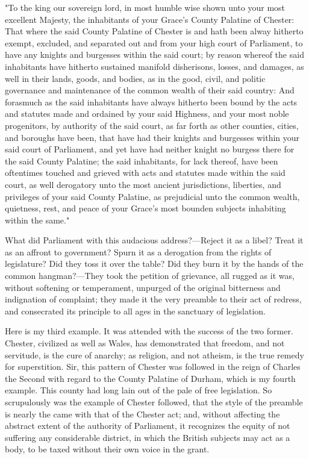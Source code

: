 "To the king our sovereign lord, in most humble wise shown unto your most excellent Majesty, the inhabitants of your Grace's County Palatine of Chester: That where the said County Palatine of Chester is and hath been alway hitherto exempt, excluded, and separated out and from your high court of Parliament, to have any knights and burgesses within the said court; by reason whereof the said inhabitants have hitherto sustained manifold disherisons, losses, and damages, as well in their lands, goods, and bodies, as in the good, civil, and politic governance and maintenance of the common wealth of their said country: And forasmuch as the said inhabitants have always hitherto been bound by the acts and statutes made and ordained by your said Highness, and your most noble progenitors, by authority of the said court, as far forth as other counties, cities, and boroughs have been, that have had their knights and burgesses within your said court of Parliament, and yet have had neither knight no burgess there for the said County Palatine; the said inhabitants, for lack thereof, have been oftentimes touched and grieved with acts and statutes made within the said court, as well derogatory unto the most ancient jurisdictions, liberties, and privileges of your said County Palatine, as prejudicial unto the common wealth, quietness, rest, and peace of your Grace's most bounden subjects inhabiting within the same."

What did Parliament with this audacious address?—Reject it as a libel? Treat it as an affront to government? Spurn it as a derogation from the rights of legislature? Did they toss it over the table? Did they burn it by the hands of the common hangman?—They took the petition of grievance, all rugged as it was, without softening or temperament, unpurged of the original bitterness and indignation of complaint; they made it the very preamble to their act of redress, and consecrated its principle to all ages in the sanctuary of legislation.

Here is my third example. It was attended with the success of the two former. Chester, civilized as well as Wales, has demonstrated that freedom, and not servitude, is the cure of anarchy; as religion, and not atheism, is the true remedy for superstition. Sir, this pattern of Chester was followed in the reign of Charles the Second with regard to the County Palatine of Durham, which is my fourth example. This county had long lain out of the pale of free legislation. So scrupulously was the example of Chester followed, that the style of the preamble is nearly the came with that of the Chester act; and, without affecting the abstract extent of the authority of Parliament, it recognizes the equity of not suffering any considerable district, in which the British subjects may act as a body, to be taxed without their own voice in the grant.

